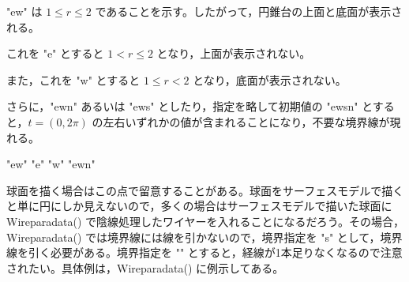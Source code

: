 \documentclass[papersize,a4paper,12pt,uplatex]{jsarticle}
\begin{document}
\vspace{\baselineskip}
"ew" は $1 \leq r \leq 2$ であることを示す。したがって，円錐台の上面と底面が表示される。

これを "e" とすると $1 <r \leq 2$ となり，上面が表示されない。

また，これを "w" とすると $1 \leq r < 2$ となり，底面が表示されない。

さらに，"ewn" あるいは "ews" としたり，指定を略して初期値の "ewsn" とすると，$t=(0,2\pi)$ の左右いずれかの値が含まれることになり，不要な境界線が現れる。

\vspace{\baselineskip}
\hspace{12mm}"ew" \hspace{25mm}"e" \hspace{25mm}"w" \hspace{25mm}"ewn"

   

球面を描く場合はこの点で留意することがある。球面をサーフェスモデルで描くと単に円にしか見えないので，多くの場合はサーフェスモデルで描いた球面に Wireparadata() で陰線処理したワイヤーを入れることになるだろう。その場合，Wireparadata() では境界線には線を引かないので，境界指定を "s" として，境界線を引く必要がある。境界指定を "" とすると，経線が1本足りなくなるので注意されたい。具体例は，Wireparadata() に例示してある。 
\end{document}
